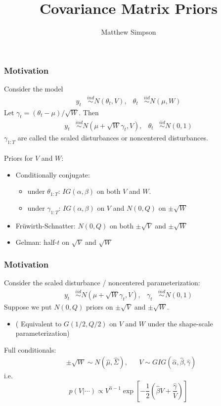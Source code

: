 \documentclass[xcolor=dvipsnames]{beamer}
\title[Cov Mat Priors]{Covariance Matrix Priors}
\author[Matt Simpson]{Matthew Simpson}
\date{}
\institute[]{Departments of Statistics and Economics, Iowa State University}
\begin{document}
\begin{frame}
\titlepage
\end{frame}

\begin{frame}
\frametitle{Motivation}
Consider the model
\begin{align*}
 y_t &\stackrel{ind}{\sim} N(\theta_t, V), &\theta_t &\stackrel{iid}{\sim} N(\mu,W)
\end{align*}
\pause
Let $\gamma_t=(\theta_t-\mu)/\sqrt{W}$. Then
\begin{align*}
 y_t &\stackrel{ind}{\sim} N(\mu + \sqrt{W}\gamma_t, V), & \theta_t &\stackrel{iid}{\sim} N(0,1)
\end{align*}
$\gamma_{1:T}$ are called the scaled disturbances or noncentered disturbances.\\~\\

\pause Priors for $V$ and $W$:
\begin{itemize}
\item Conditionally conjugate:
\begin{itemize}
\item under $\theta_{1:T}$: $IG(\alpha,\beta)$ on both $V$ and $W$.
\item under $\gamma_{1:T}$: $IG(\alpha,\beta)$  on $V$ and $N(0,Q)$ on $\pm\sqrt{W}$
\end{itemize}
\item Fr{\"u}wirth-Schnatter: $N(0,Q)$ on both $\pm\sqrt{V}$ and $\pm\sqrt{W}$
\item Gelman: half-$t$ on $\sqrt{V}$ and $\sqrt{W}$
\end{itemize}
\end{frame}

\begin{frame}
\frametitle{Motivation}
Consider the scaled disturbance / noncentered parameterization:
\begin{align*}
 y_t &\stackrel{iid}{\sim} N(\mu + \sqrt{W}\gamma_t, V), &\gamma_t &\stackrel{ind}{\sim} N(0,1)
\end{align*}
Suppose we put $N(0,Q)$ priors on $\pm\sqrt{V}$ and $\pm\sqrt{W}$.
\begin{itemize}
\item[]( Equivalent to $G(1/2, Q/2)$ on $V$ and $W$ under the shape-scale parameterization)
\end{itemize}

\pause
Full conditionals:
\begin{align*}
&\pm\sqrt{W}\sim N(\hat{\mu},\hat{\Sigma}), &&V\sim GIG(\hat{\alpha},\hat{\beta},\hat{\gamma})
\end{align*}
i.e. 
\[
p(V|\cdots)\propto V^{\hat{\alpha} -1}\exp\left[-\frac{1}{2}\left(\hat{\beta} V + \frac{\hat{\gamma}}{V}\right)\right]
\]
\end{frame}
\end{document}
